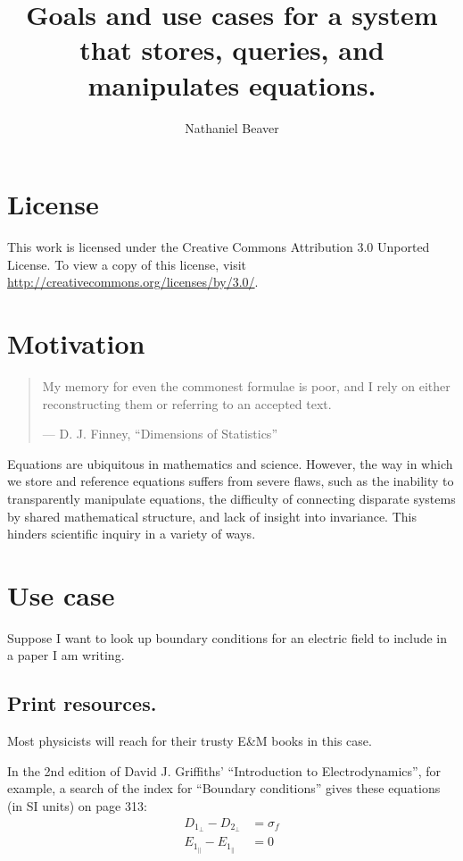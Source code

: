 \documentclass[12pt,letterpaper]{article}
\author{Nathaniel Beaver}
\title{Goals and use cases for a system that stores, queries, and manipulates equations.}
\begin{document}
\maketitle

\tableofcontents

\section{License}

This work is licensed under the Creative Commons Attribution 3.0 Unported License.
To view a copy of this license, visit \url{http://creativecommons.org/licenses/by/3.0/}.

\section{Motivation}

\begin{quote}
My memory for even the commonest
formulae is poor, and I rely on either reconstructing them or referring to an accepted text.

--- D. J. Finney, ``Dimensions of Statistics''
\end{quote}

Equations are ubiquitous in mathematics and science.
However, the way in which we store and reference equations suffers from severe flaws,
such as the inability to transparently manipulate equations,
the difficulty of connecting disparate systems by shared mathematical structure,
and lack of insight into invariance.
This hinders scientific inquiry in a variety of ways.

\section{Use case}

Suppose I want to look up boundary conditions for an electric field to include in a paper I am writing.

\subsection{Print resources.}

Most physicists will reach for their trusty E\&M books in this case.

In the 2nd edition of David J. Griffiths' ``Introduction to Electrodynamics'', for example,
a search of the index for ``Boundary conditions'' gives these equations (in SI units) on page 313:
\begin{align*}
D_{1_\bot} - D_{2_\bot} &= \sigma_f \\
E_{1_\parallel} - E_{1_\parallel} &= 0
\end{align*}
\end{document}
